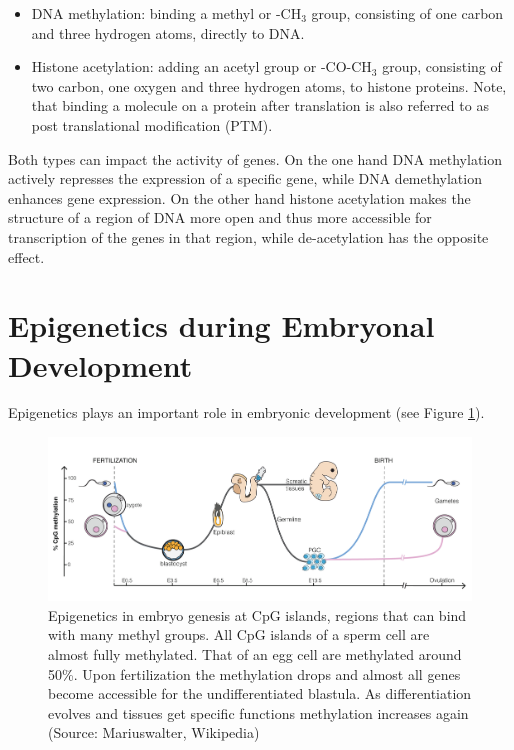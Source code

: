 \documentclass[
  11pt,
]{book}
\providecommand{\tightlist}{%
  \setlength{\itemsep}{0pt}\setlength{\parskip}{0pt}}
\begin{document}
\begin{itemize}
\tightlist
\item
  DNA methylation: binding a methyl or -CH\(_3\) group, consisting of one carbon and three hydrogen atoms, directly to DNA.
\item
  Histone acetylation: adding an acetyl group or -CO-CH\(_3\) group, consisting of two carbon, one oxygen and three hydrogen atoms, to histone proteins. Note, that binding a molecule on a protein after translation is also referred to as post translational modification (PTM).
\end{itemize}

Both types can impact the activity of genes.
On the one hand DNA methylation actively represses the expression of a specific gene, while DNA demethylation enhances gene expression.
On the other hand histone acetylation makes the structure of a region of DNA more open and thus more accessible for transcription of the genes in that region, while de-acetylation has the opposite effect.

\hypertarget{epigenetics-during-embryonal-development}{%
\section{Epigenetics during Embryonal Development}\label{epigenetics-during-embryonal-development}}

Epigenetics plays an important role in embryonic development (see Figure \ref{fig:epiEmbryo}).



\begin{figure}

{\centering \includegraphics[width=1\linewidth]{./figs/DNA_methylation_reprogramming} 

}

\caption{Epigenetics in embryo genesis at CpG islands, regions that can bind with many methyl groups. All CpG islands of a sperm cell are almost fully methylated. That of an egg cell are methylated around 50\%. Upon fertilization the methylation drops and almost all genes become accessible for the undifferentiated blastula. As differentiation evolves and tissues get specific functions methylation increases again (Source: Mariuswalter, Wikipedia)}\label{fig:epiEmbryo}
\end{figure}
\end{document}
